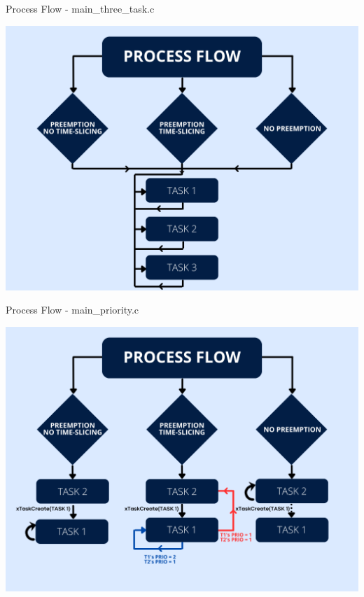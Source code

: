 \documentclass{beamer}
\begin{document}
\begin{frame}{Process Flow - main\_three\_task.c}

\vfill
\centering
\includegraphics[width=0.65\linewidth]{img/three_tasks.png} 
\vfill
    
\end{frame}

\begin{frame}{Process Flow - main\_priority.c}

\vfill
\centering
\includegraphics[width=0.65\linewidth]{img/dynamic_priority.png} 
\vfill
    
\end{frame}
\end{document}
